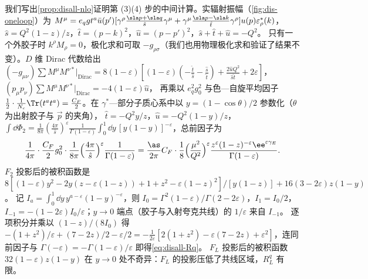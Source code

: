 \begin{example}\label{ex:disall-nlo}
我们写出\cref{prop:disall-nlo}证明第 (3)(4) 步的中间计算。实辐射振幅（\cref{fig:dis-oneloop}）为
$M^\mu=e_qgt^a\bar u(p')[\gamma^\rho\frac{\sla p+\sla q}{\hat s}\gamma^\mu+\gamma^\mu\frac{\sla p-\sla k}{\hat t}\gamma^\rho]u(p)\varepsilon^*_\rho(k)$，$\hat s=Q^2(1-z)/z$，$\hat t=(p-k)^2$，$\hat u=(p-p')^2$，$\hat s+\hat t+\hat u=-Q^2$。
只有一个外胶子时 $k^\rho M_\rho=0$，极化求和可取 $-g_{\rho\sigma}$（我们也用物理极化求和验证了结果不变）。$D$ 维 Dirac 代数给出
$(-g_{\mu\nu})\sum M^\mu M^{\nu*}|_{\mathrm{Dirac}}=8(1-\varepsilon)[(1-\varepsilon)(-\frac{\hat t}{\hat s}-\frac{\hat s}{\hat t})+\frac{2\hat uQ^2}{\hat s\hat t}+2\varepsilon]$，$(p_\mu p_\nu)\sum M^\mu M^{\nu*}|_{\mathrm{Dirac}}=-4(1-\varepsilon)\hat u$，
再乘以 $e_q^2g_0^2$ 与色—自旋平均因子 $\frac12\cdot\frac1{N_c}\Tr(t^at^a)=\frac{C_F}2$。在 $\gamma^*$—部分子质心系中以 $y=(1-\cos\theta)/2$ 参数化（$\theta$ 为出射胶子与 $\vec p$ 的夹角），
$\hat t=-Q^2y/z$，$\hat u=-Q^2(1-y)/z$，$\int\dd\Phi_2=\frac1{8\pi}(\frac{4\pi}{\hat s})^\varepsilon\frac1{\Gamma(1-\varepsilon)}\int_0^1\dd y\,[y(1-y)]^{-\varepsilon}$，总前因子为
\begin{equation*}
\frac1{4\pi}\cdot\frac{C_F}2g_0^2\cdot\frac1{8\pi}\Big(\frac{4\pi}{\hat s}\Big)^\varepsilon\frac1{\Gamma(1-\varepsilon)}=\frac{\as}{2\pi}C_F\cdot\frac18\Big(\frac{\mu^2}{Q^2}\Big)^\varepsilon\frac{z^\varepsilon(1-z)^{-\varepsilon}\ee^{\varepsilon\gamma_E}}{\Gamma(1-\varepsilon)}.
\end{equation*}
$F_2$ 投影后的被积函数是 $8[(1-\varepsilon)y^2-2y(z-\varepsilon(1-z))+1+z^2-\varepsilon(1-z)^2]/[y(1-z)]+16(3-2\varepsilon)z(1-y)$。
记 $I_a=\int_0^1\dd y\,y^{a-\varepsilon}(1-y)^{-\varepsilon}$，则 $I_0=\Gamma^2(1-\varepsilon)/\Gamma(2-2\varepsilon)$，$I_1=I_0/2$，$I_{-1}=-(1-2\varepsilon)I_0/\varepsilon$；$y\to0$ 端点（胶子与入射夸克共线）的 $1/\varepsilon$ 来自 $I_{-1}$。
逐项积分并乘以 $(1-z)/(8I_0)$ 得 $-(1+z^2)/\varepsilon+(7-2z)/2-\varepsilon/2=-\frac1{2\varepsilon}[2(1+z^2)-\varepsilon(7-2z)+\varepsilon^2]$，连同前因子与 $\Gamma(-\varepsilon)=-\Gamma(1-\varepsilon)/\varepsilon$ 即得\cref{eq:disall-Rq}。
$F_L$ 投影后的被积函数 $32(1-\varepsilon)z(1-y)$ 在 $y\to0$ 处不奇异：$F_L$ 的投影压低了共线区域，$R^q_L$ 有限。


\end{example}
